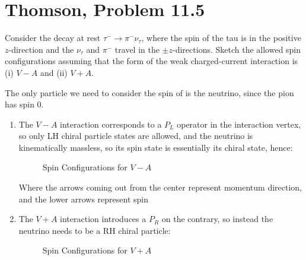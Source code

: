 \documentclass[12pt]{article}
\begin{document}
\section{Thomson, Problem 11.5}
\begin{problem}
  Consider the decay at rest $\tau^-\to\pi^-\nu_\tau$, where the spin of the tau is in the positive $z$-direction and the $\nu_\tau$ and $\pi^-$ travel in the $\pm z$-directions.  Sketch the allowed spin configurations assuming that the form of the weak charged-current interaction is (i) $V-A$ and (ii) $V+A$.
\end{problem}
The only particle we need to consider the spin of is the neutrino, since the pion has spin 0.
\begin{enumerate}[label = (\roman*)]
\item The $V-A$ interaction corresponds to a $P_L$ operator in the interaction vertex, so only LH chiral particle states are allowed, and the neutrino is kinematically massless, so its spin state is essentially its chiral state, hence:
  \begin{figure}[H]
    \centering
    \caption{Spin Configurations for $V-A$}\label{fig:p3a}
  \end{figure}
  Where the arrows coming out from the center represent momentum direction, and the lower arrows represent spin
\item The $V+A$ interaction introduces a $P_R$ on the contrary, so instead the neutrino needs to be a RH chiral particle:
  \begin{figure}[H]
    \centering
    \caption{Spin Configurations for $V+A$}\label{fig:p3b}
  \end{figure}
\end{enumerate}
\newpage
\end{document}

